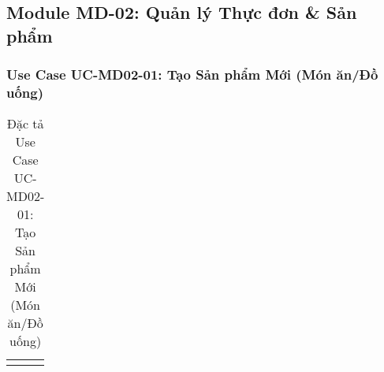 \subsection{Module MD-02: Quản lý Thực đơn \& Sản phẩm}

\subsubsection{Use Case UC-MD02-01: Tạo Sản phẩm Mới (Món ăn/Đồ uống)}
\begin{longtable}{|m{4cm}|p{11cm}|}
\caption{Đặc tả Use Case UC-MD02-01: Tạo Sản phẩm Mới (Món ăn/Đồ uống)} \label{tab:uc_md02_01} \\
\hline

\endhead %

\hline
\endfoot %


\end{longtable}
